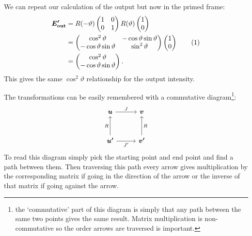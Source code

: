     We can repeat our calculation of the output but now in the primed frame:
    \begin{align*}
        \vv{E_{\mathrm{out}}'} &= R(-\vartheta)
        \begin{pmatrix}
            1 & 0\\
            0 & 1
        \end{pmatrix}
        R(\vartheta)
        \begin{pmatrix}
            1\\ 0
        \end{pmatrix}
        \\
        &= 
        \begin{pmatrix}
            \cos^2\vartheta & -\cos\vartheta\sin\vartheta\\
            -\cos\vartheta\sin\vartheta & \sin^2\vartheta\\
        \end{pmatrix}
        \begin{pmatrix}
            1\\ 0
        \end{pmatrix}
        \refstepcounter{equation}\tag{\theequation}\label{eqn:rotate matrix}\\
        &=
        \begin{pmatrix}
            \cos^2\vartheta\\
            -\cos\vartheta\sin\vartheta
        \end{pmatrix}
        .
    \end{align*}
    This gives the same \(\cos^2\vartheta\) relationship for the output intensity.
    
    The transformations can be easily remembered with a commutative diagram\footnote{the `commutative' part of this diagram is simply that any path between the same two points gives the same result. Matrix multiplication is non-commutative so the order arrows are traversed is important.}:
    \tikzexternaldisable
    \[
        \begin{tikzcd}[column sep=1cm, row sep=1cm]
            \vv{u}  \arrow{r}{J}  & \vv{v}\\
            \vv{u'} \arrow{r}[swap]{J'} \arrow{u}{R} & \vv{v'} \arrow{u}[swap]{R}
        \end{tikzcd}
    \]
    \tikzexternalenable
    To read this diagram simply pick the starting point and end point and find a path between them.
    Then traversing this path every arrow gives multiplication by the corresponding matrix if going in the direction of the arrow or the inverse of that matrix if going against the arrow.
    
